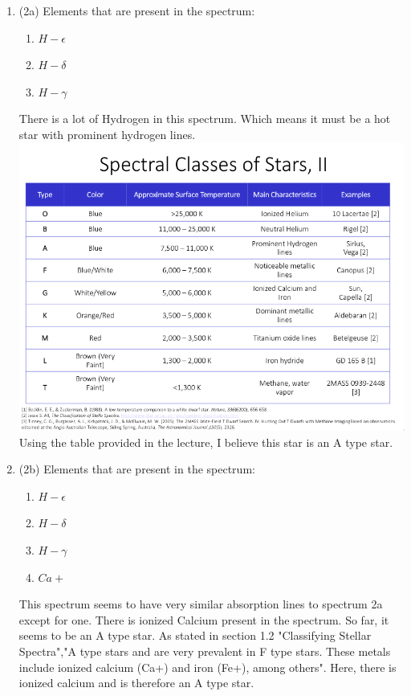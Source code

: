 \documentclass[12pt]{article}
\begin{document}
\begin{enumerate}
        \item (2a) Elements that are present in the spectrum:
            \begin{enumerate}
                \item $H-\epsilon$
                \item $H-\delta$
                \item $H-\gamma$
            \end{enumerate}
            There is a lot of Hydrogen in this spectrum. Which means it must be a hot star with prominent hydrogen lines.\newline
            \includegraphics[scale=0.5]{spectral_table}
            Using the table provided in the lecture, I believe this star is an A type star.
        \item (2b) Elements that are present in the spectrum:
            \begin{enumerate}
                \item $H-\epsilon$
                \item $H-\delta$
                \item $H-\gamma$
                \item $Ca+$
            \end{enumerate}
            This spectrum seems to have very similar absorption lines to spectrum 2a except for one. There is ionized Calcium present in the spectrum. So far, it seems to be an A type star.\newline\newline
            As stated in section 1.2 "Classifying Stellar Spectra","A type stars and are very prevalent in F type stars. These metals include ionized calcium (Ca+) and iron (Fe+), among others". Here, there is ionized calcium and is therefore an A type star.


\end{enumerate}
\end{document}
